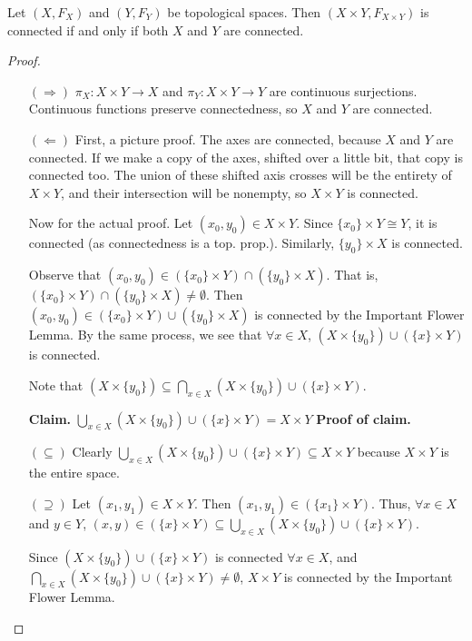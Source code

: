 \begin{theorem}
Let $(X, F_X)$ and $(Y, F_Y)$ be topological spaces. Then $(X\times Y, F_{X\times Y})$ is connected if and only if both $X$ and $Y$ are connected.
\end{theorem}
\begin{proof}
\begin{itemize}
\item[$(\Rightarrow)$]
$\pi_X: X\times Y \longrightarrow X$ and $\pi_Y: X\times Y \longrightarrow Y$ are continuous surjections. Continuous functions preserve connectedness, so $X$ and $Y$ are connected. 
\item[$(\Leftarrow)$]
First, a picture proof.
\placeholder
The axes are connected, because $X$ and $Y$ are connected. If we make a copy of the axes, shifted over a little bit, that copy is connected too. The union of these shifted axis crosses will be the entirety of $X\times Y$, and their intersection will be nonempty, so $X\times Y$ is connected.

Now for the actual proof.  Let $(x_0, y_0) \in X\times Y.$  Since $\{x_0\}\times Y \cong Y$, it is connected (as connectedness is a top. prop.). Similarly, $\{y_0\} \times X$ is connected.

Observe that $(x_0, y_0) \in (\{x_0\}\times Y) \cap (\{y_0\} \times X)$.  That is, $(\{x_0\}\times Y) \cap (\{y_0\} \times X) \neq \emptyset$.  Then $(x_0, y_0) \in (\{x_0\}\times Y) \cup (\{y_0\} \times X)$ is connected by the Important Flower Lemma.  By the same process, we see that $\forall x\in X$, $(X\times \{y_0\}) \cup (\{x\} \times Y)$ is connected.

Note that $(X\times \{y_0\}) \subseteq \displaystyle{\bigcap_{x \in X}(X\times \{y_0\}) \cup (\{x\} \times Y)}$.

\textbf{Claim.}  $\displaystyle{\bigcup_{x \in X}(X\times \{y_0\}) \cup (\{x\} \times Y)} = X\times Y$
\textbf{Proof of claim.}

$(\subseteq)$ Clearly $\displaystyle{\bigcup_{x \in X}(X\times \{y_0\}) \cup (\{x\} \times Y)} \subseteq X\times Y$ because $X\times Y$ is the entire space. 

$(\supseteq)$ Let $(x_1, y_1) \in X\times Y$.  Then $(x_1, y_1) \in (\{x_1\}\times Y)$.  Thus, $\forall x\in X$ and $y\in Y$, $(x,y) \in (\{x\} \times Y) \subseteq {\displaystyle\bigcup_{x \in X}(X\times \{y_0\}) \cup (\{x\} \times Y)}$.


Since $(X\times \{y_0\}) \cup (\{x\} \times Y)$ is connected $\forall x\in X$, and $\displaystyle{\bigcap_{x \in X}(X\times \{y_0\}) \cup (\{x\} \times Y)}\neq \emptyset$, $X\times Y$ is connected by the Important Flower Lemma.
\end{itemize}
\end{proof}

